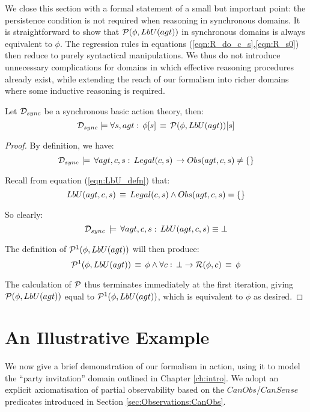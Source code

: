 We close this section with a formal statement of a small but important
point: the persistence condition is not required when reasoning in
synchronous domains. It is straightforward to show that $\mathcal{P}(\phi,LbU(agt))$
in synchronous domains is always equivalent to $\phi$. The regression
rules in equations (\ref{eqn:R_do_c_s},\ref{eqn:R_s0}) then reduce
to purely syntactical manipulations. We thus do not introduce unnecessary
complications for domains in which effective reasoning procedures
already exist, while extending the reach of our formalism into richer
domains where some inductive reasoning is required.

\begin{thm}
Let $\mathcal{D}_{sync}$ be a synchronous basic action theory, then:\[
\mathcal{D}_{sync}\models\forall s,agt:\,\phi[s]\,\equiv\,\mathcal{P}(\phi,LbU(agt))[s]\]

\end{thm}
\begin{proof}
By definition, we have:\[
\mathcal{D}_{sync}\,\models\,\forall agt,c,s:\, Legal(c,s)\,\rightarrow Obs(agt,c,s)\neq\{\}\]


Recall from equation (\ref{eqn:LbU_defn}) that:\[
LbU(agt,c,s)\,\equiv\, Legal(c,s)\wedge Obs(agt,c,s)=\{\}\]


So clearly:\[
\mathcal{D}_{sync}\,\models\,\forall agt,c,s:\,LbU(agt,c,s)\equiv\bot\]


The definition of $\mathcal{P}^{1}(\phi,LbU(agt))$ will then produce:\[
\mathcal{P}^{1}(\phi,LbU(agt))\,\equiv\,\phi\wedge\forall c:\,\bot\rightarrow\mathcal{R}(\phi,c)\,\equiv\,\phi\]


The calculation of $\mathcal{P}$ thus terminates immediately at the first
iteration, giving $\mathcal{P}(\phi,LbU(agt))$ equal to $\mathcal{P}^{1}(\phi,LbU(agt))$,
which is equivalent to $\phi$ as desired. 
\end{proof}

\section{An Illustrative Example\label{sec:Knowledge:Example}}

We now give a brief demonstration of our formalism in action, using
it to model the {}``party invitation'' domain outlined in Chapter
\ref{ch:intro}. We adopt an explicit axiomatisation of partial observability
based on the $CanObs$/$CanSense$ predicates introduced in Section
\ref{sec:Observations:CanObs}.

